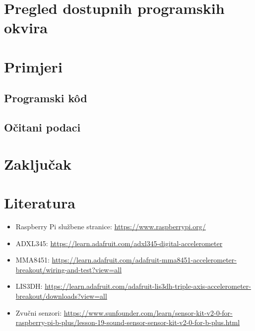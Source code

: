 \documentclass[12pt,a4paper]{article}
\begin{document}
\section{Pregled dostupnih programskih okvira}

\newpage
\section{Primjeri}
	\subsection{Programski kôd}
	\subsection{Očitani podaci}

\newpage
\section{Zaključak}

\newpage
\section{Literatura}

\begin{itemize}
	\item Raspberry Pi službene stranice: \url{https://www.raspberrypi.org/}
	\item ADXL345: \url{https://learn.adafruit.com/adxl345-digital-accelerometer}
	\item MMA8451: \url{https://learn.adafruit.com/adafruit-mma8451-accelerometer-breakout/wiring-and-test?view=all}
	\item LIS3DH: \url{https://learn.adafruit.com/adafruit-lis3dh-triple-axis-accelerometer-breakout/downloads?view=all}
	\item Zvučni senzori: \url{https://www.sunfounder.com/learn/sensor-kit-v2-0-for-raspberry-pi-b-plus/lesson-19-sound-sensor-sensor-kit-v2-0-for-b-plus.html}
\end{itemize}
\end{document}
